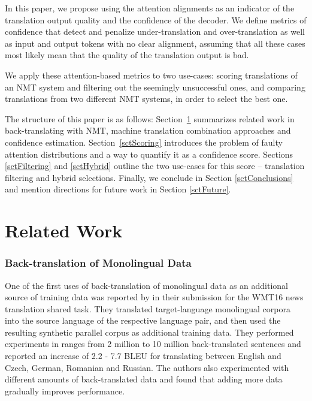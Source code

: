 \documentclass[]{article}
\begin{document}
In this paper, we propose using the attention alignments as an indicator of the translation output quality and the confidence of the decoder. We define metrics of confidence that detect and penalize under-translation and over-translation \citep{modelling-coverage} as well as input and output tokens with no clear alignment, assuming that all these cases most likely mean that the quality of the translation output is bad.

We apply these attention-based metrics to two use-cases: scoring translations of an NMT system and filtering out the seemingly unsuccessful ones, and comparing translations from two different NMT systems, in order to select the best one.

The structure of this paper is as follows: Section~\ref{sctRelWork} summarizes related work in back-translating with NMT, machine translation combination approaches and confidence estimation. Section~\ref{sctScoring} introduces the problem of faulty attention distributions and a way to quantify it as a confidence score. Sections \ref{sctFiltering} and \ref{sctHybrid} outline the two use-cases for this score -- translation filtering and hybrid selections. Finally, we conclude in Section \ref{sctConclusions} and mention directions for future work in Section \ref{sctFuture}.

\section{Related Work}
\label{sctRelWork}

\subsubsection*{Back-translation of Monolingual Data}

One of the first uses of back-translation of monolingual data as an additional source of training data was reported by \citep{sennrich2016} in their submission for the WMT16 news translation shared task. They translated target-language monolingual corpora into the source language of the respective language pair, and then used the resulting synthetic parallel corpus as additional training data. They performed experiments in ranges from 2 million to 10 million back-translated sentences and reported an increase of 2.2 - 7.7 BLEU \citep{papineni2002bleu} for translating between English and Czech, German, Romanian and Russian. The authors also experimented with different amounts of back-translated data and found that adding more data gradually improves performance.
\end{document}

